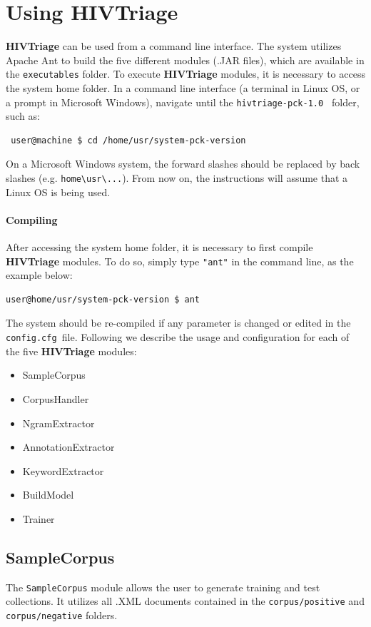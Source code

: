\documentclass[11pt]{article}
\newcommand{\system}{{\bf{HIVTriage}}}
\newcommand{\homefolder}{\texttt{hivtriage-pck-\version{ }}}
\newcommand{\configfile}{\texttt{config.cfg{ }}}
\def\version{{\tt 1.0}}
\begin{document}
\section{Using \system{}}
\system{} can be used from a command line interface. 
The system utilizes Apache Ant to build the five different modules (.JAR files), 
which are available in the \texttt{executables} folder.
To execute \system{} modules, it is necessary to access the system home folder.
In a command line interface (a terminal in Linux OS, or a prompt in Microsoft Windows), 
navigate until the \homefolder{} folder, such as:

\begin{lstlisting}
 user@machine $ cd /home/usr/system-pck-version 
\end{lstlisting}

On a Microsoft Windows system, the forward slashes should be replaced by back slashes
(e.g. \texttt{home\textbackslash usr\textbackslash ...}). 
From now on, the instructions will assume that a Linux OS is being used.

\paragraph{Compiling} 
After accessing the system home folder, it is necessary to first compile \system{} modules.
To do so, simply type \texttt{"ant"} in the command line, as the example below:
\begin{lstlisting}
user@home/usr/system-pck-version $ ant
\end{lstlisting}
The system should be re-compiled if any parameter is changed or edited in the \configfile file.
Following we describe the usage and configuration for each of the five \system{} modules:
\begin{itemize}
\item SampleCorpus
\item CorpusHandler
\item NgramExtractor
\item AnnotationExtractor
\item KeywordExtractor
\item BuildModel
\item Trainer
\end{itemize}


\subsection{SampleCorpus} 
The \texttt{SampleCorpus} module allows the user to generate training and test collections. 
It utilizes all .XML documents contained in the \texttt{corpus/positive} and \texttt{corpus/negative} folders.
\end{document}
